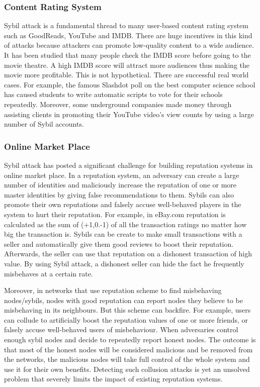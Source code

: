 \documentclass[conference]{IEEEtran}
\begin{document}
\subsubsection{Content Rating System}
Sybil attack is a fundamental thread to many user-based content rating system such as GoodReads, YouTube and IMDB. 
There are huge incentives in this kind of attacks because attackers can promote low-quality content to a wide audience. 
It has been studied that many people check the IMDB score before going to the movie theatre. 
A high IMDB score will attract more audiences thus making the movie more profitable. This is not hypothetical. 
There are successful real world cases. 
For example, the famous Slashdot poll on the best computer science school has caused students to write automatic scripts to vote for their schools repeatedly. 
Moreover, some underground companies made money through assisting clients in promoting their YouTube video's view counts by using a large number of Sybil accounts.\cite{Tran09SOC}

\subsubsection{Online Market Place}
Sybil attack has posted a significant challenge for building reputation systems in online market place. 
In a reputation system, an adversary can create a large number of identities and maliciously increase the reputation of one or more master identities by giving false 
recommendations to them. 
Sybils can also promote their own reputations and falsely accuse well-behaved players in the system to hurt their reputation. 
For example, in eBay.com reputation is calculated as the sum of (+1,0.-1) of all the transaction ratings no matter how big the transaction is. 
Sybils can be create to make small transactions with a seller and automatically give them good reviews to boost their reputation. 
Afterwards, the seller can use that reputation on a dishonest transaction of high value. 
By using Sybil attack, a dishonest seller can hide the fact he frequently misbehaves at a certain rate.

Moreover, in networks that use reputation scheme to find misbehaving nodes/sybils, 
nodes with good reputation can report nodes they believe to be misbehaving in its neighbours. 
But this scheme can backfire. 
For example, users can collude to artificially boost the reputation values of one or more friends, or falsely accuse well-behaved users of misbehaviour. 
When adversaries control enough sybil nodes and decide to repeatedly report honest nodes. 
The outcome is that most of the honest nodes will be considered malicious and be removed from the networks, 
the malicious nodes will take full control of the whole system and use it for their own benefits. 
Detecting such collusion attacks is yet an unsolved problem that severely limits the impact of existing reputation systems.\cite{Swamynathan10reputation}\cite{Lian07anempirical}
\end{document}
